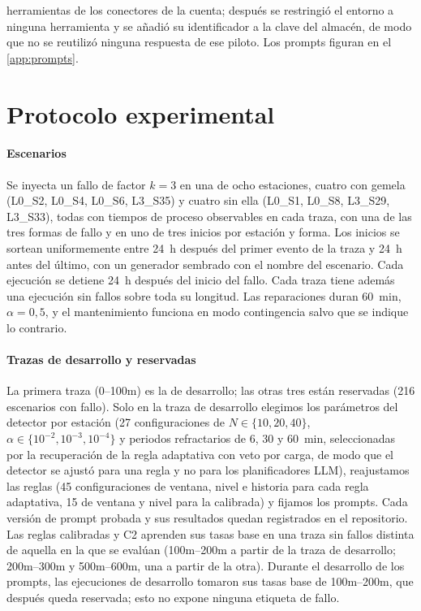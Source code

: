 \documentclass[preprint,11pt]{elsarticle}
\begin{document}
herramientas de los conectores de la cuenta; después se restringió el entorno a ninguna herramienta y se añadió su identificador a la clave del almacén, de modo que no se reutilizó ninguna respuesta de ese piloto. Los prompts figuran en el \ref{app:prompts}.

\section{Protocolo experimental}
\label{sec:protocol}

\paragraph{Escenarios}
Se inyecta un fallo de factor $k=3$ en una de ocho estaciones, cuatro con gemela (L0\_S2, L0\_S4, L0\_S6, L3\_S35) y cuatro sin ella (L0\_S1, L0\_S8, L3\_S29, L3\_S33), todas con tiempos de proceso observables en cada traza, con una de las tres formas de fallo y en uno de tres inicios por estación y forma. Los inicios se sortean uniformemente entre 24~h después del primer evento de la traza y 24~h antes del último, con un generador sembrado con el nombre del escenario. Cada ejecución se detiene 24~h después del inicio del fallo. Cada traza tiene además una ejecución sin fallos sobre toda su longitud. Las reparaciones duran 60~min, $\alpha=0{,}5$, y el mantenimiento funciona en modo contingencia salvo que se indique lo contrario.

\paragraph{Trazas de desarrollo y reservadas}
La primera traza (0--100m) es la de desarrollo; las otras tres están reservadas (216 escenarios con fallo). Solo en la traza de desarrollo elegimos los parámetros del detector por estación (27 configuraciones de $N \in \{10, 20, 40\}$, $\alpha \in \{10^{-2}, 10^{-3}, 10^{-4}\}$ y periodos refractarios de 6, 30 y 60~min, seleccionadas por la recuperación de la regla adaptativa con veto por carga, de modo que el detector se ajustó para una regla y no para los planificadores LLM), reajustamos las reglas (45 configuraciones de ventana, nivel e historia para cada regla adaptativa, 15 de ventana y nivel para la calibrada) y fijamos los prompts. Cada versión de prompt probada y sus resultados quedan registrados en el repositorio. Las reglas calibradas y C2 aprenden sus tasas base en una traza sin fallos distinta de aquella en la que se evalúan (100m--200m a partir de la traza de desarrollo; 200m--300m y 500m--600m, una a partir de la otra). Durante el desarrollo de los prompts, las ejecuciones de desarrollo tomaron sus tasas base de 100m--200m, que después queda reservada; esto no expone ninguna etiqueta de fallo.
\end{document}
